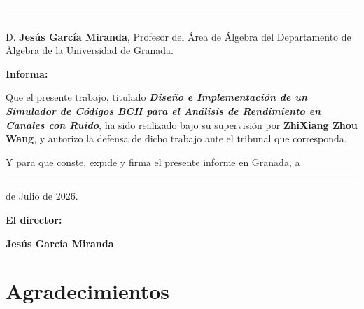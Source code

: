 \noindent\rule[-1ex]{\textwidth}{2pt}\\[4.5ex]

D. \textbf{Jesús García Miranda}, Profesor del Área de Álgebra del Departamento de Álgebra de la Universidad de Granada. 

\vspace{0.5cm}

\textbf{Informa:} 

\vspace{0.5cm}

Que el presente trabajo, titulado \textit{\textbf{Diseño e Implementación de un Simulador de Códigos BCH para el Análisis de Rendimiento en Canales con Ruido}}, ha sido realizado bajo su supervisión por \textbf{ZhiXiang Zhou Wang}, y autorizo la defensa de dicho trabajo ante el tribunal que corresponda.

\vspace{1.5cm}

Y para que conste, expide y firma el presente informe en Granada, a \rule{1cm}{0.4pt} de Julio de 2026. 

\vspace{1cm}

\textbf{El director:} 

\vspace{4cm}

\noindent \textbf{Jesús García Miranda} 

\cleardoublepage


\chapter*{Agradecimientos}
\thispagestyle{empty}

\vspace{1cm}


\cleardoublepage